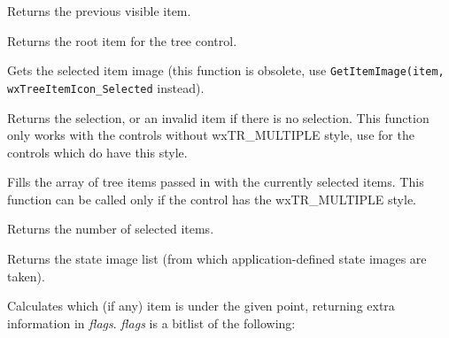 
Returns the previous visible item.

\label{wxtreectrlgetrootitem}


Returns the root item for the tree control.

\label{wxtreectrlgetitemselectedimage}


Gets the selected item image (this function is obsolete, use
{\tt GetItemImage(item, wxTreeItemIcon\_Selected} instead).

\label{wxtreectrlgetselection}


Returns the selection, or an invalid item if there is no selection.
This function only works with the controls without wxTR\_MULTIPLE style, use
 for the controls which do have
this style.

\label{wxtreectrlgetselections}


Fills the array of tree items passed in with the currently selected items. This
function can be called only if the control has the wxTR\_MULTIPLE style.

Returns the number of selected items.


\label{wxtreectrlgetstateimagelist}


Returns the state image list (from which application-defined state images are taken).

\label{wxtreectrlhittest}


Calculates which (if any) item is under the given point, returning extra information
in {\it flags}. {\it flags} is a bitlist of the following:

